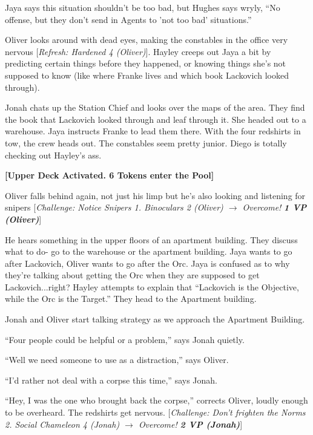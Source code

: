 Jaya says this situation shouldn't be too bad, but Hughes says wryly, ``No offense, but they don't send in Agents to 'not too bad' situations.''



Oliver looks around with dead eyes, making the constables in the office very nervous {[}\textit{Refresh: Hardened 4 (Oliver)}{]}.  Hayley creeps out Jaya a bit by predicting certain things before they happened, or knowing things she's not supposed to know (like where Franke lives and which book Lackovich looked through).



Jonah chats up the Station Chief and looks over the maps of the area.  They find the book that Lackovich looked through and leaf through it.  She headed out to a warehouse.  Jaya instructs Franke to lead them there.  With the four redshirts in tow, the crew heads out.  The constables seem pretty junior.  Diego is totally checking out Hayley's ass. 



\textbf{{[}Upper Deck Activated.  6 Tokens enter the Pool{]}}



Oliver falls behind again, not just his limp but he's also looking and listening for snipers {[}\textit{Challenge: Notice Snipers 1. Binoculars 2 (Oliver) $\rightarrow$ Overcome! }\textit{\textbf{1 VP (Oliver)}}{]}



He hears something in the upper floors of an apartment building.  They discuss what to do- go to the warehouse or the apartment building.  Jaya wants to go after Lackovich, Oliver wants to go after the Orc.  Jaya is confused as to why they're talking about getting the Orc when they are supposed to get Lackovich...right?  Hayley attempts to explain that ``Lackovich is the Objective, while the Orc is the Target.''  They head to the Apartment building.



Jonah and Oliver start talking strategy as we approach the Apartment Building.

``Four people could be helpful or a problem,'' says Jonah quietly.

``Well we need someone to use as a distraction,'' says Oliver.

``I'd rather not deal with a corpse this time,'' says Jonah.

``Hey, I was the one who brought back the corpse,'' corrects Oliver, loudly enough to be overheard.  The redshirts get nervous.  {[}\textit{Challenge: Don't frighten the Norms 2.  Social Chameleon 4 (Jonah) $\rightarrow$ Overcome! }\textit{\textbf{2 VP (Jonah)}}{]}



